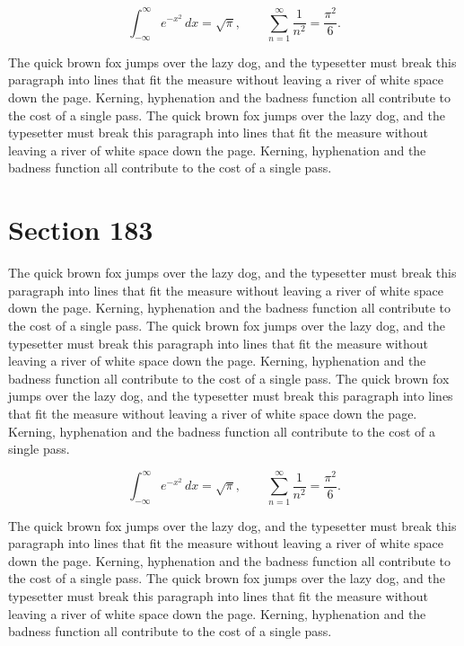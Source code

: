 \documentclass{article}
\begin{document}
\begin{equation}
\int_{-\infty}^{\infty} e^{-x^{2}}\,dx = \sqrt{\pi}, \qquad
\sum_{n=1}^{\infty} \frac{1}{n^{2}} = \frac{\pi^{2}}{6}.
\end{equation}

The quick brown fox jumps over the lazy dog, and the typesetter must break this paragraph into lines that fit the measure without leaving a river of white space down the page. Kerning, hyphenation and the badness function all contribute to the cost of a single pass. The quick brown fox jumps over the lazy dog, and the typesetter must break this paragraph into lines that fit the measure without leaving a river of white space down the page. Kerning, hyphenation and the badness function all contribute to the cost of a single pass. 
\section{Section 183}
The quick brown fox jumps over the lazy dog, and the typesetter must break this paragraph into lines that fit the measure without leaving a river of white space down the page. Kerning, hyphenation and the badness function all contribute to the cost of a single pass. The quick brown fox jumps over the lazy dog, and the typesetter must break this paragraph into lines that fit the measure without leaving a river of white space down the page. Kerning, hyphenation and the badness function all contribute to the cost of a single pass. The quick brown fox jumps over the lazy dog, and the typesetter must break this paragraph into lines that fit the measure without leaving a river of white space down the page. Kerning, hyphenation and the badness function all contribute to the cost of a single pass. 

\begin{equation}
\int_{-\infty}^{\infty} e^{-x^{2}}\,dx = \sqrt{\pi}, \qquad
\sum_{n=1}^{\infty} \frac{1}{n^{2}} = \frac{\pi^{2}}{6}.
\end{equation}

The quick brown fox jumps over the lazy dog, and the typesetter must break this paragraph into lines that fit the measure without leaving a river of white space down the page. Kerning, hyphenation and the badness function all contribute to the cost of a single pass. The quick brown fox jumps over the lazy dog, and the typesetter must break this paragraph into lines that fit the measure without leaving a river of white space down the page. Kerning, hyphenation and the badness function all contribute to the cost of a single pass. 
\end{document}
